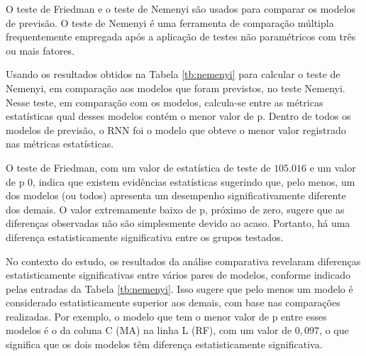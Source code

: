 O teste de Friedman e o teste de Nemenyi são usados para comparar os modelos de previsão. O teste de Nemenyi é uma ferramenta de comparação múltipla frequentemente empregada após a aplicação de testes não paramétricos com três ou mais fatores.

Usando os resultados obtidos na Tabela \ref{tb:nemenyi} para calcular o teste de Nemenyi, em comparação aos modelos que foram previstos, no teste Nemenyi. Nesse teste, em comparação com os modelos, calcula-se entre as métricas estatísticas qual desses modelos contém o menor valor de p. Dentro de todos os modelos de previsão, o RNN foi o modelo que obteve o menor valor registrado nas métricas estatísticas.

O teste de Friedman, com um valor de estatística de teste de $105.016$ e um valor de p $0$, indica que existem evidências estatísticas sugerindo que, pelo menos, um dos modelos (ou todos) apresenta um desempenho significativamente diferente dos demais. O valor extremamente baixo de p, próximo de zero, sugere que as diferenças observadas não são simplesmente devido ao acaso. Portanto, há uma diferença estatisticamente significativa entre os grupos testados.

No contexto do estudo, os resultados da análise comparativa revelaram diferenças estatisticamente significativas entre vários pares de modelos, conforme indicado pelas entradas da Tabela \ref{tb:nemenyi}. Isso sugere que pelo menos um modelo é considerado estatisticamente superior aos demais, com base nas comparações realizadas. Por exemplo, o modelo que tem o menor valor de p entre esses modelos é o da coluna C (MA) na linha L (RF), com um valor de $0,097$, o que significa que os dois modelos têm diferença estatisticamente significativa.



